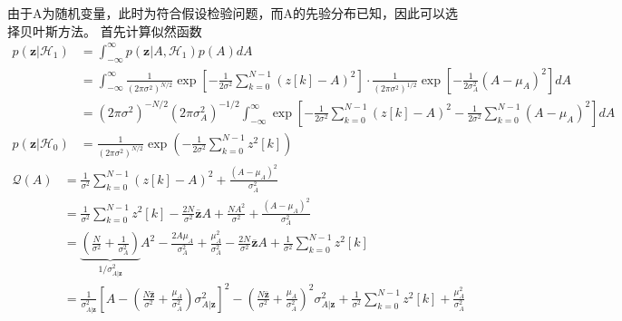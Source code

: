 \documentclass[fontset=windows]{article}
\numberwithin{figure}{section}
\begin{document}
由于A为随机变量，此时为符合假设检验问题，而A的先验分布已知，因此可以选择贝叶斯方法。
首先计算似然函数
\begin{align*}
	p(\mathbf{z}|\mathcal{H}_1)
	 & =\int_{-\infty}^{\infty}p(\mathbf{z}|A,\mathcal{H}_1)p(A)dA                                 \\
	 & =\int_{-\infty}^{\infty}\frac{1}{(2\pi \sigma^2)^{N/2}}
	\exp\left[-\frac{1}{2\sigma^2}\sum_{k=0}^{N-1}(z[k]-A)^2\right]
	\cdot \frac{1}{(2\pi \sigma^2)^{1/2}}\exp\left[-\frac{1}{2\sigma^2_A}(A-\mu_A)^2\right]dA      \\
	 & =(2\pi \sigma^2)^{-N/2}(2\pi \sigma^2_A)^{-1/2}
	\int_{-\infty}^{\infty} \exp\left[-\frac{1}{2\sigma^2}\sum_{k=0}^{N-1}(z[k]-A)^2-
	\frac{1}{2\sigma^2}\sum_{k=0}^{N-1}(A-\mu_A)^2 \right]dA                                       \\
	p(\mathbf{z}|\mathcal{H}_0)
	 & =\frac{1}{(2\pi \sigma^2)^{N/2}}\exp\left(-\frac{1}{2\sigma^2}\sum_{k=0}^{N-1}z^2[k]\right)
\end{align*}
\begin{align*}
	\mathcal{Q}(A)
	 & =\frac{1}{\sigma^2}\sum_{k=0}^{N-1}(z[k]-A)^2+\frac{(A-\mu_A)^2}{\sigma^2_A}                             \\
	 & =\frac{1}{\sigma^2}\sum_{k=0}^{N-1}z^2[k]-\frac{2N}{\sigma^2}\mathbf{\overline{z}}A
	+\frac{NA^2}{\sigma^2}+\frac{(A-\mu_A)^2}{\sigma^2_A}                                                       \\
	 & =\underset{1/\sigma^2_{A|\mathbf{z}}}{\underbrace{\left(\frac{N}{\sigma^2}+\frac{1}{\sigma^2_A}\right)}}
	A^2-\frac{2A\mu_A}{\sigma^2_A}+\frac{\mu^2_A}{\sigma^2_A}-\frac{2N}{\sigma^2}\mathbf{\overline{z}}A+
	\frac{1}{\sigma^2}\sum_{k=0}^{N-1}z^2[k]                                                                    \\
	 & =\frac{1}{\sigma^2_{A|\mathbf{z}}}\left[A-
	\left(\frac{N\overline{\mathbf{z}}}{\sigma^2}+\frac{\mu_A}{\sigma_A^2}\right)\sigma^2_{A|\mathbf{z}}\right]^2
	-\left(\frac{N\overline{\mathbf{z}}}{\sigma^2}+\frac{\mu_A}{\sigma_A^2}\right)^2\sigma^2_{A|\mathbf{z}}
	+\frac{1}{\sigma^2}\sum_{k=0}^{N-1}z^2[k]+\frac{\mu^2_A}{\sigma^2_A}
\end{align*}
\end{document}
